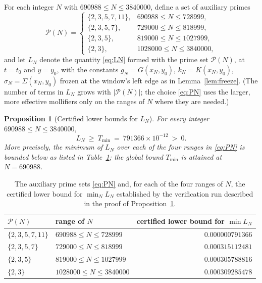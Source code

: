 \documentclass[11pt]{article}
\newtheorem{proposition}[theorem]{Proposition}
\theoremstyle{definition}
\newcommand{\calP}{\mathcal{P}}
\begin{document}
For each integer $N$ with $690988\le N\le 3840000$, define a set of
auxiliary primes
\begin{equation}\label{eq:PN}
\calP(N)=
\begin{cases}
\{2,3,5,7,11\}, & 690988\le N\le728999,\\
\{2,3,5,7\}, & 729000\le N\le818999,\\
\{2,3,5\}, & 819000\le N\le1027999,\\
\{2,3\}, & 1028000\le N\le3840000,
\end{cases}
\end{equation}
and let $L_N$ denote the quantity \eqref{eq:LN} formed with the
prime set $\calP(N)$, at $t=t_0$ and $y=y_0$, with the constants
$g_N=G(x_N,y_0)$, $k_N=K(x_N,y_0)$, $\sigma_N=\Sigma(x_N,y_0)$
frozen at the window's left edge as in Lemma~\ref{lem:freeze}. (The
number of terms in $L_N$ grows with $|\calP(N)|$; the choice
\eqref{eq:PN} uses the larger, more effective mollifiers only on the
ranges of $N$ where they are needed.)

\begin{proposition}[Certified lower bounds for $L_N$]\label{prop:sweep}
For every integer $690988\le N\le3840000$,
\[
L_N\ \ge\ T_{\min}\ =\ 791366\times10^{-12}\ >\ 0 .
\]
More precisely, the minimum of $L_N$ over each of the four ranges in
\eqref{eq:PN} is bounded below as listed in
Table~\ref{tab:primesets}; the global bound $T_{\min}$ is attained
at $N=690988$.
\end{proposition}

\begin{table}[ht!]
\centering
\begin{tabular}{@{}llr@{}}
\toprule
$\calP(N)$ & range of $N$ & certified lower bound for $\min L_N$\\
\midrule
$\{2,3,5,7,11\}$ & $690988\le N\le728999$ & $0.000000791366$\\
$\{2,3,5,7\}$    & $729000\le N\le818999$ & $0.000315112481$\\
$\{2,3,5\}$      & $819000\le N\le1027999$ & $0.000305788816$\\
$\{2,3\}$        & $1028000\le N\le3840000$ & $0.000309285478$\\
\bottomrule
\end{tabular}
\caption{The auxiliary prime sets \eqref{eq:PN} and, for each of the
four ranges of $N$, the certified lower bound for $\min_N L_N$
established by the verification run described in the proof of
Proposition~\ref{prop:sweep}.}
\label{tab:primesets}
\end{table}
\end{document}
